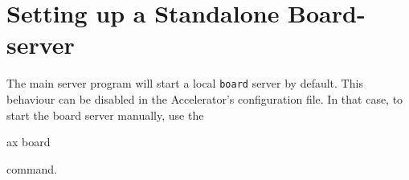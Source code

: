 \section{Setting up a Standalone Board-server}
The main server program will start a local \texttt{board} server by
default.  This behaviour can be disabled in the Accelerator's
configuration file.  In that case, to start the board server manually,
use the
\begin{python}
ax board
\end{python}
command.
